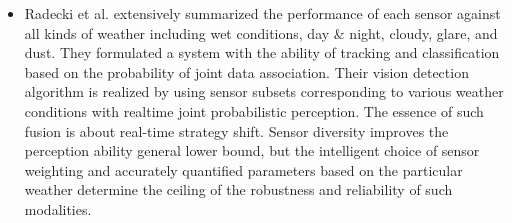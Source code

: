 \documentclass[rnd]{mas_proposal}
\begin{document}
\begin{itemize}
    \item Radecki et al. \cite{radecki2016all} extensively summarized the performance of each sensor against all kinds of weather including wet conditions, day \& night, cloudy, glare, and dust. They formulated a system with the ability of tracking and classification based on the probability of joint data association. Their vision detection algorithm is realized by using sensor subsets corresponding to various weather conditions with realtime joint probabilistic perception. The essence of such fusion is about real-time strategy shift. Sensor diversity improves the perception ability general lower bound, but the intelligent choice of sensor weighting and accurately quantified parameters based on the particular weather determine the ceiling of the robustness and reliability of such modalities.


\end{itemize}
\end{document}
